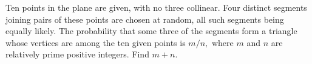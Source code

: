 Ten points in the plane are given, with no three collinear.  Four distinct segments joining pairs of these points are chosen at random, all such segments being equally likely.  The probability that some three of the segments form a triangle whose vertices are among the ten given points is $m/n,$ where $m$ and $n$ are relatively prime positive integers.  Find $m+n.$